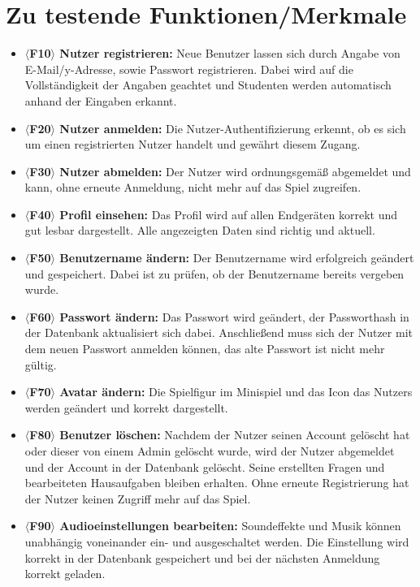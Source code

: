 \section{Zu testende Funktionen/Merkmale}

\begin{itemize}
\item \textbf{$\langle$F10$\rangle$ Nutzer registrieren: }Neue Benutzer lassen sich durch Angabe von E-Mail/y-Adresse, sowie Passwort registrieren. Dabei wird auf die Vollständigkeit der Angaben geachtet und Studenten werden automatisch anhand der Eingaben erkannt.
\item \textbf{$\langle$F20$\rangle$ Nutzer anmelden: }Die Nutzer-Authentifizierung erkennt, ob es sich um einen registrierten Nutzer handelt und gewährt diesem Zugang.
\item \textbf{$\langle$F30$\rangle$ Nutzer abmelden: }Der Nutzer wird ordnungsgemäß abgemeldet und kann, ohne erneute Anmeldung, nicht mehr auf das Spiel zugreifen.
\item \textbf{$\langle$F40$\rangle$ Profil einsehen: }Das Profil wird auf allen Endgeräten korrekt und gut lesbar dargestellt. Alle angezeigten Daten sind richtig und aktuell.
\item \textbf{$\langle$F50$\rangle$ Benutzername ändern: }Der Benutzername wird erfolgreich geändert und gespeichert. Dabei ist zu prüfen, ob der Benutzername bereits vergeben wurde.
\item \textbf{$\langle$F60$\rangle$ Passwort ändern: }Das Passwort wird geändert, der Passworthash in der Datenbank aktualisiert sich dabei. Anschließend muss sich der Nutzer mit dem neuen Passwort anmelden können, das alte Passwort ist nicht mehr gültig.
\item \textbf{$\langle$F70$\rangle$ Avatar ändern: }Die Spielfigur im Minispiel und das Icon das Nutzers werden geändert und korrekt dargestellt.
\item \textbf{$\langle$F80$\rangle$ Benutzer löschen: }Nachdem der Nutzer seinen Account gelöscht hat oder dieser von einem Admin gelöscht wurde, wird der Nutzer abgemeldet und der Account in der Datenbank gelöscht. Seine erstellten Fragen und bearbeiteten Hausaufgaben bleiben erhalten. Ohne erneute Registrierung hat der Nutzer keinen Zugriff mehr auf das Spiel.
\item \textbf{$\langle$F90$\rangle$ Audioeinstellungen bearbeiten: }Soundeffekte und Musik können unabhängig voneinander ein- und ausgeschaltet werden. Die Einstellung wird korrekt in der Datenbank gespeichert und bei der nächsten Anmeldung korrekt geladen.

\end{itemize}
